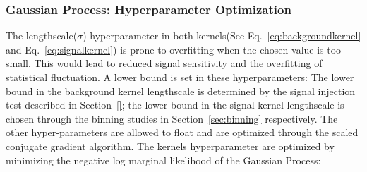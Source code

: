 %
%
%            
%
%
%
%
    \subsubsection{Gaussian Process: Hyperparameter Optimization}
    \label{sec:hyperparam}
    The lengthscale($\sigma$) hyperparameter in both kernels(See Eq.~\ref{eq:backgroundkernel} and Eq.~\ref{eq:signalkernel}) is prone to overfitting when the chosen value is too small. This would lead to reduced signal sensitivity and the overfitting of statistical fluctuation. A lower bound is set in these hyperparameters: The lower bound in the background kernel lengthscale is determined by the signal injection test described in Section~\ref{}; the lower bound in the signal kernel lengthscale
    is chosen through the binning studies in Section~\ref{sec:binning} respectively. The other hyper-parameters are allowed to float and are optimized through the scaled conjugate gradient algorithm.
%
    The kernels hyperparameter are optimized by minimizing the negative log marginal likelihood of the Gaussian Process:

